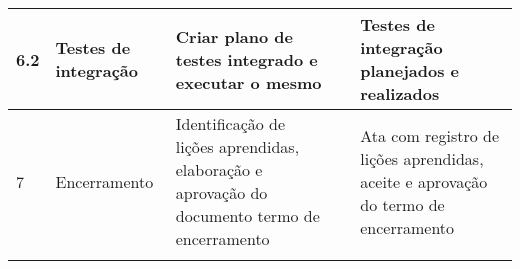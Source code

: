 \begin{longtable}{ l  p{}  p{}  l  p{}  }
		\midrule
		6.2         & Testes de integração                                    & Criar plano de testes integrado e executar o mesmo &  & Testes de integração planejados e realizados \\*
		\midrule
		7           & Encerramento                                              & Identificação de lições aprendidas, elaboração e aprovação do documento termo de encerramento &                   & Ata com registro de lições aprendidas, aceite e aprovação do termo de encerramento \\*
		\bottomrule
	\centering
\end{longtable}
